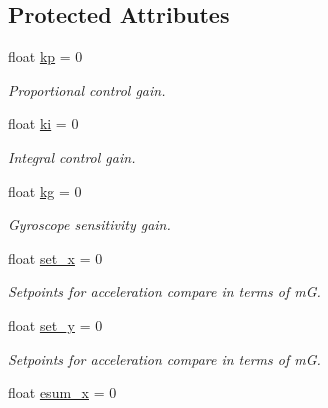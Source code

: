 \subsection*{Protected Attributes}
\begin{DoxyCompactItemize}
\item 
float \hyperlink{classBalance_a69636e840985b0b556f5289955305b0e}{kp} = 0\hypertarget{classBalance_a69636e840985b0b556f5289955305b0e}{}\label{classBalance_a69636e840985b0b556f5289955305b0e}

\begin{DoxyCompactList}\small\item\em Proportional control gain. \end{DoxyCompactList}\item 
float \hyperlink{classBalance_a926a86bdc9a6d52ba616dc8beb1d3a98}{ki} = 0\hypertarget{classBalance_a926a86bdc9a6d52ba616dc8beb1d3a98}{}\label{classBalance_a926a86bdc9a6d52ba616dc8beb1d3a98}

\begin{DoxyCompactList}\small\item\em Integral control gain. \end{DoxyCompactList}\item 
float \hyperlink{classBalance_af88044329c863eb6847338e443f7a840}{kg} = 0\hypertarget{classBalance_af88044329c863eb6847338e443f7a840}{}\label{classBalance_af88044329c863eb6847338e443f7a840}

\begin{DoxyCompactList}\small\item\em Gyroscope sensitivity gain. \end{DoxyCompactList}\item 
float \hyperlink{classBalance_a94ea3cf125d0741f620c76dd851e50d1}{set\+\_\+x} = 0\hypertarget{classBalance_a94ea3cf125d0741f620c76dd851e50d1}{}\label{classBalance_a94ea3cf125d0741f620c76dd851e50d1}

\begin{DoxyCompactList}\small\item\em Setpoints for acceleration compare in terms of mG. \end{DoxyCompactList}\item 
float \hyperlink{classBalance_a4c1a5b2446c3cb493227db2b4492f18a}{set\+\_\+y} = 0\hypertarget{classBalance_a4c1a5b2446c3cb493227db2b4492f18a}{}\label{classBalance_a4c1a5b2446c3cb493227db2b4492f18a}

\begin{DoxyCompactList}\small\item\em Setpoints for acceleration compare in terms of mG. \end{DoxyCompactList}\item 
float \hyperlink{classBalance_ad60ec931a4eb0d993805cf4f67e506ec}{esum\+\_\+x} = 0\hypertarget{classBalance_ad60ec931a4eb0d993805cf4f67e506ec}{}\label{classBalance_ad60ec931a4eb0d993805cf4f67e506ec}


\end{DoxyCompactItemize}
